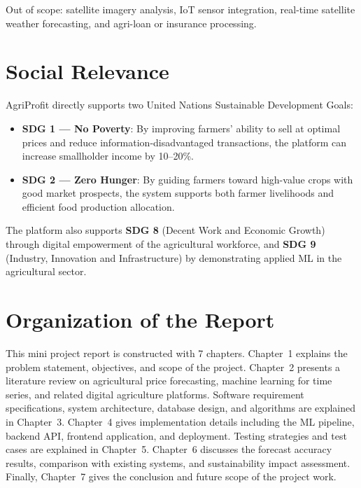 \documentclass[12pt,a4paper]{report}
\begin{document}
Out of scope: satellite imagery analysis, IoT sensor integration, real-time satellite
weather forecasting, and agri-loan or insurance processing.

\section{Social Relevance}

AgriProfit directly supports two United Nations Sustainable Development Goals:
\begin{itemize}
    \item \textbf{SDG 1 --- No Poverty}: By improving farmers' ability to sell at optimal
    prices and reduce information-disadvantaged transactions, the platform can increase
    smallholder income by 10--20\%.
    \item \textbf{SDG 2 --- Zero Hunger}: By guiding farmers toward high-value crops with
    good market prospects, the system supports both farmer livelihoods and efficient food
    production allocation.
\end{itemize}

The platform also supports \textbf{SDG 8} (Decent Work and Economic Growth) through digital
empowerment of the agricultural workforce, and \textbf{SDG 9} (Industry, Innovation and
Infrastructure) by demonstrating applied ML in the agricultural sector.

\section{Organization of the Report}

This mini project report is constructed with 7 chapters. Chapter~1 explains the problem
statement, objectives, and scope of the project. Chapter~2 presents a literature review
on agricultural price forecasting, machine learning for time series, and related digital
agriculture platforms. Software requirement specifications, system architecture, database
design, and algorithms are explained in Chapter~3. Chapter~4 gives implementation details
including the ML pipeline, backend API, frontend application, and deployment. Testing
strategies and test cases are explained in Chapter~5. Chapter~6 discusses the forecast
accuracy results, comparison with existing systems, and sustainability impact assessment.
Finally, Chapter~7 gives the conclusion and future scope of the project work.

\end{document}
